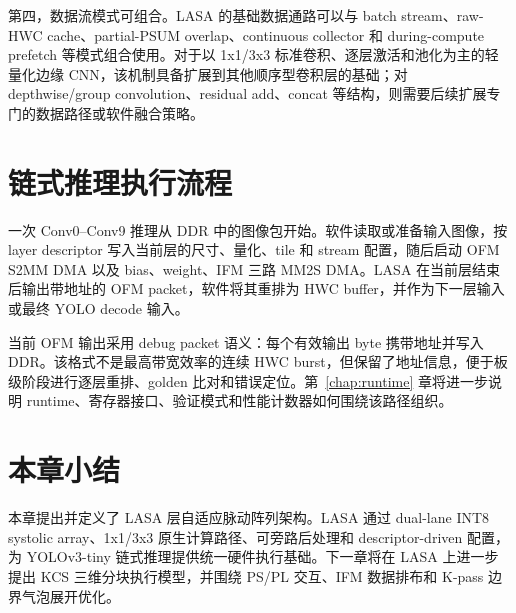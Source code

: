 第四，数据流模式可组合。LASA 的基础数据通路可以与 batch stream、raw-HWC cache、partial-PSUM overlap、continuous collector 和 during-compute prefetch 等模式组合使用。对于以 1x1/3x3 标准卷积、逐层激活和池化为主的轻量化边缘 CNN，该机制具备扩展到其他顺序型卷积层的基础；对 depthwise/group convolution、residual add、concat 等结构，则需要后续扩展专门的数据路径或软件融合策略。

\section{链式推理执行流程}

一次 Conv0--Conv9 推理从 DDR 中的图像包开始。软件读取或准备输入图像，按 layer descriptor 写入当前层的尺寸、量化、tile 和 stream 配置，随后启动 OFM S2MM DMA 以及 bias、weight、IFM 三路 MM2S DMA。LASA 在当前层结束后输出带地址的 OFM packet，软件将其重排为 HWC buffer，并作为下一层输入或最终 YOLO decode 输入。

当前 OFM 输出采用 debug packet 语义：每个有效输出 byte 携带地址并写入 DDR。该格式不是最高带宽效率的连续 HWC burst，但保留了地址信息，便于板级阶段进行逐层重排、golden 比对和错误定位。第~\ref{chap:runtime} 章将进一步说明 runtime、寄存器接口、验证模式和性能计数器如何围绕该路径组织。

\section{本章小结}

本章提出并定义了 LASA 层自适应脉动阵列架构。LASA 通过 dual-lane INT8 systolic array、1x1/3x3 原生计算路径、可旁路后处理和 descriptor-driven 配置，为 YOLOv3-tiny 链式推理提供统一硬件执行基础。下一章将在 LASA 上进一步提出 KCS 三维分块执行模型，并围绕 PS/PL 交互、IFM 数据排布和 K-pass 边界气泡展开优化。
